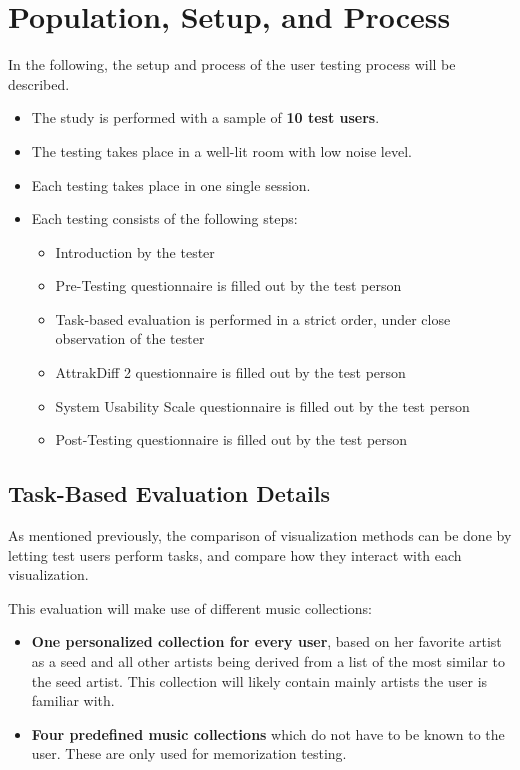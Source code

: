 \section{Population, Setup, and Process}

In the following, the setup and process of the user testing process will be described.

\begin{itemize}
  \item The study is performed with a sample of \textbf{10 test users}. 
  \item The testing takes place in a well-lit room with low noise level.
  \item Each testing takes place in one single session.
  \item Each testing consists of the following steps:
	\begin{itemize}
		\item Introduction by the tester
		\item Pre-Testing questionnaire is filled out by the test person
		\item Task-based evaluation is performed in a strict order, under close observation of the tester
		\item AttrakDiff 2 questionnaire is filled out by the test person	
		\item System Usability Scale questionnaire is filled out by the test person	
		\item Post-Testing questionnaire is filled out by the test person
	\end{itemize}
\end{itemize}

\subsection{Task-Based Evaluation Details}

As mentioned previously, the comparison of visualization methods can be done by letting test users perform tasks, and compare how they interact with each visualization. 

This evaluation will make use of different music collections:

\begin{itemize}
	\item \textbf{One personalized collection for every user}, based on her favorite artist as a seed and all other artists being derived from a list of the most similar to the seed artist. This collection will likely contain mainly artists the user is familiar with.
	\item \textbf{Four predefined music collections} which do not have to be known to the user. These are only used for memorization testing.
\end{itemize}

